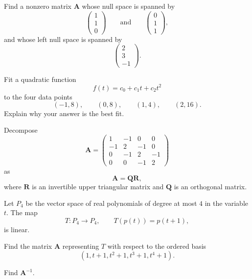 \documentclass[11pt,oneside]{article}
\begin{document}
\begin{problem}
Find a nonzero matrix $\mathbf A$ whose null space is spanned by
\[
\begin{pmatrix}
1\\1\\0
\end{pmatrix}
\qquad\text{and}\qquad
\begin{pmatrix}
0\\1\\1
\end{pmatrix},
\]
and whose left null space is spanned by
\[
\begin{pmatrix}
2\\3\\-1
\end{pmatrix}.
\]
\end{problem}

\begin{problem}
Fit a quadratic function
\[
f(t)=c_0+c_1t+c_2t^2
\]
to the four data points
\[
(-1,8),\qquad(0,8),\qquad(1,4),\qquad(2,16).
\]
Explain why your answer is the best fit.
\end{problem}

\begin{problem}
Decompose
\[
\mathbf A=
\begin{pmatrix}
1&-1&0&0\\
-1&2&-1&0\\
0&-1&2&-1\\
0&0&-1&2
\end{pmatrix}
\]
as
\[
\mathbf A=\mathbf Q\mathbf R,
\]
where $\mathbf R$ is an invertible upper triangular matrix and $\mathbf Q$ is an orthogonal matrix.
\end{problem}

\begin{problem}
Let $P_4$ be the vector space of real polynomials of degree at most $4$ in the variable $t$. The map
\[
T\colon P_4\to P_4,
\qquad
T(p(t))=p(t+1),
\]
is linear.
\begin{problemsubparts}
\item Find the matrix $\mathbf A$ representing $T$ with respect to the ordered basis
\[
(1,t+1,t^2+1,t^3+1,t^4+1).
\]
\item Find $\mathbf A^{-1}$.
\end{problemsubparts}
\end{problem}
\end{document}
